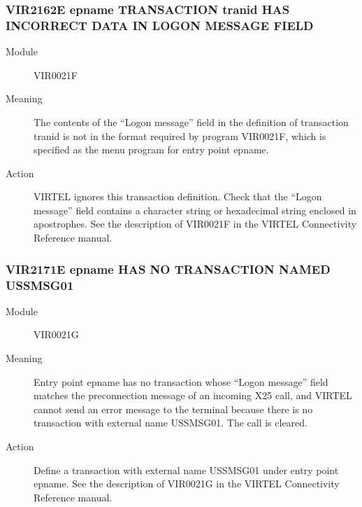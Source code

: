 \documentclass[letterpaper,10pt,english]{sphinxmanual}
\begin{document}
\subsubsection{VIR2162E epname TRANSACTION tranid HAS INCORRECT DATA IN LOGON MESSAGE FIELD}
\label{\detokenize{messages:vir2162e-epname-transaction-tranid-has-incorrect-data-in-logon-message-field}}\begin{description}
\item[{Module}] \leavevmode
VIR0021F

\item[{Meaning}] \leavevmode
The contents of the “Logon message” field in the definition of transaction tranid is not in the format required by program VIR0021F, which is specified as the menu program for entry point epname.

\item[{Action}] \leavevmode
VIRTEL ignores this transaction definition. Check that the “Logon message” field contains a character string or hexadecimal string enclosed in apostrophes. See the description of VIR0021F in the VIRTEL Connectivity Reference manual.

\end{description}


\subsubsection{VIR2171E epname HAS NO TRANSACTION NAMED USSMSG01}
\label{\detokenize{messages:vir2171e-epname-has-no-transaction-named-ussmsg01}}\begin{description}
\item[{Module}] \leavevmode
VIR0021G

\item[{Meaning}] \leavevmode
Entry point epname has no transaction whose “Logon message” field matches the preconnection message of an incoming X25 call, and VIRTEL cannot send an error message to the terminal because there is no transaction with external name USSMSG01. The call is cleared.

\item[{Action}] \leavevmode
Define a transaction with external name USSMSG01 under entry point epname. See the description of VIR0021G in the VIRTEL Connectivity Reference manual.

\end{description}
\end{document}
